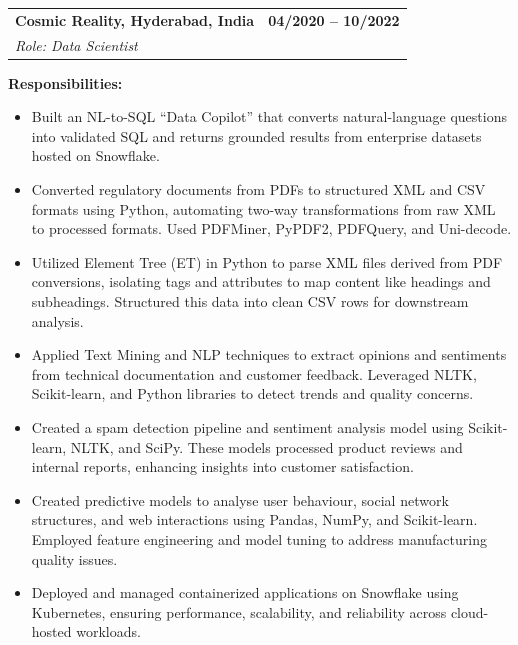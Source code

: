 \documentclass[11pt,letterpaper]{article}
\begin{document}
\noindent
\begin{tabularx}{\linewidth}{@{}X r@{}}
  \textbf{Cosmic Reality, Hyderabad, India} & \textbf{04/2020 -- 10/2022}\\
  \textit{Role: Data Scientist} &
\end{tabularx}

\textbf{Responsibilities:}
\begin{itemize}
  \item Built an NL-to-SQL ``Data Copilot'' that converts natural-language questions into validated
        SQL and returns grounded results from enterprise datasets hosted on Snowflake.

  \item Converted regulatory documents from PDFs to structured XML and CSV formats using Python,
        automating two-way transformations from raw XML to processed formats. Used PDFMiner,
        PyPDF2, PDFQuery, and Uni-decode.

  \item Utilized Element Tree (ET) in Python to parse XML files derived from PDF conversions,
        isolating tags and attributes to map content like headings and subheadings. Structured this
        data into clean CSV rows for downstream analysis.

  \item Applied Text Mining and NLP techniques to extract opinions and sentiments from technical
        documentation and customer feedback. Leveraged NLTK, Scikit-learn, and Python libraries
        to detect trends and quality concerns.

  \item Created a spam detection pipeline and sentiment analysis model using Scikit-learn, NLTK,
        and SciPy. These models processed product reviews and internal reports, enhancing insights
        into customer satisfaction.

  \item Created predictive models to analyse user behaviour, social network structures, and web
        interactions using Pandas, NumPy, and Scikit-learn. Employed feature engineering and model
        tuning to address manufacturing quality issues.

  \item Deployed and managed containerized applications on Snowflake using Kubernetes, ensuring
        performance, scalability, and reliability across cloud-hosted workloads.


\end{itemize}
\end{document}
